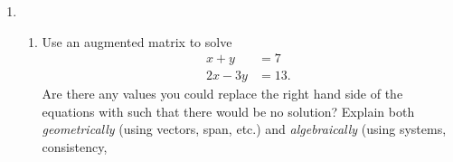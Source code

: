 \documentclass[letter]{article}
\newcommand{\mat}[1]{\begin{bmatrix}#1\end{bmatrix}}
\newenvironment{answer}{
	\begin{adjustwidth}{8mm}{} \vspace{2mm}}{\end{adjustwidth} \vspace{2mm}
}
\theoremstyle{plain}
\theoremstyle{definition}
\theoremstyle{remark}
\begin{document}
\begin{enumerate}
\begin{enumerate}
\begin{answer}
			\end{answer}			
			\item Write down the system of equations coming from the rows of the vector equation
				\[
					x\vec a+y\vec b+z\vec c=\vec w.
				\]
			\begin{answer}
				\[
				\begin{cases}
				x + 4y + d_z &= w_1 \\
				2x + 5y + z &= w_2 \\
				3x + 6y + z &= w_3.
				\end{cases}
				\]
			\end{answer}
			\item Give three numeric examples of different vectors $\vec w$ such that the above system is consistent
				no matter what $d$ is. Explain.
			\begin{answer}
				For the system to be consistent no matter what $d$ is, $w_1-2w_2+w_3 = 0$. Therefore, pick 
				\[
				\vec{w} = \mat{0\\0\\0} \text{ or } \mat{1\\1\\1} \text{ or } \mat{1\\2\\3}.
				\]
			\end{answer}
			\item Give a numeric example of a vector $\vec w$ such that the above system is only 
				consistent for some $d$. Explain.
			\begin{answer}
				When $d = 1$, the system is consistent only if $w_1 - 2w_2 + w_3 = 0$. Hence if $w_1 - 2w_2 + w_3 \neq 0$, then the system is consistent only when $d \neq 1$. We can pick
				\[
				\vec{w} = \mat{1\\1\\0}
				\]
				for this situation to happen. 
			\end{answer}
			\end{enumerate}
		\item \begin{enumerate}
				\item Use an augmented matrix to solve
					\begin{align*}
						x+y&=7\\
						2x-3y&=13.
					\end{align*}
					Are there any values you could replace the right hand side of the equations with
					such that there would be no solution?  Explain both \emph{geometrically}
					(using vectors, span, etc.) and \emph{algebraically} (using systems, consistency,

\end{enumerate}
\end{enumerate}
\end{document}

